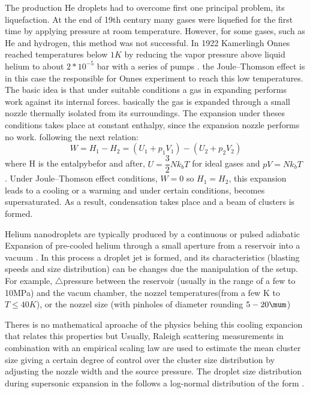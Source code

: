 The production He droplets had to overcome first one principal problem, its liquefaction. At the end  of 19th century many gases were liquefied for the first time by applying pressure at room temperature. However, for some gases, such as He and hydrogen, this method was not successful. In 1922 Kamerlingh Onnes reached temperatures below $1K$ by reducing the vapor pressure above liquid helium to about $2*10^{-5}$ bar with a series of pumps \cite{van_delft_discovery_2010}. the Joule–Thomson effect \cite{weinberger_discovery_2013} is in this case the responsible for Onnes experiment to reach this low temperatures. The basic idea is that under suitable conditions a gas in expanding performs work against its internal forces. basically the gas is expanded through a small nozzle thermally isolated from its surroundings. The expansion under theses conditions takes place at constant enthalpy, since the expansion nozzle performs no work. following the next relation:
\begin{equation}

W= H_{1}-H_{2} = (U_{1}+p_{1}V_{1})-(U_{2}+p_{2}V_{2})
\end{equation}
where H is the entalpybefor and after, $U=\dfrac{3}{2}Nk_{b}T$ for ideal gases and $pV=Nk_{b}T$ \cite{enss_low-temperature_2005}. Under Joule–Thomson effect conditions, $W=0$ so $H_{1}=H_{2}$, this expansion leads to a cooling or a warming and under certain conditions, becomes supersaturated. As a result, condensation takes place and a beam of clusters is formed.

Helium nanodroplets are typically produced by a continuous or pulsed adiabatic Expansion of pre-cooled helium through a small aperture from a reservoir into a vacuum  \cite{stienkemeier_spectroscopy_2006}. In this process a droplet jet is formed, and its characteristics (blasting speeds and size distribution) can be changes due the manipulation of the setup. For example, $\bigtriangleup$pressure between the reservoir  (usually in the range of a few to 10MPa) and the vacum chamber, the nozzel temperatures(from a few K to $T \leqslant 40K$), or the nozzel size (with pinholes of diameter rounding  $5-20 \mum$)

Theres is no mathematical aproache of the physics behing this cooling expancion that relates this properties but Usually,
Raleigh scattering measurements in combination with an empirical scaling law \cite{hagena_cluster_1972} are used to estimate the mean cluster size giving a certain degree of control over the cluster size distribution by adjusting the nozzle width and the source pressure. The droplet size distribution during supersonic expansion in the follows a log-normal distribution of the form \cite{harms_density_1998}.


